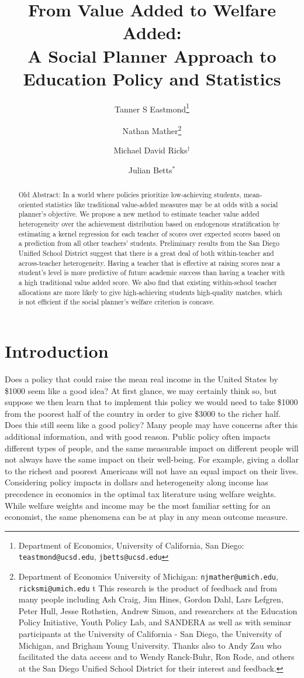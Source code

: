 \documentclass{article}
\title{From Value Added to Welfare Added: \\ A Social Planner Approach to Education Policy and Statistics}
\author{Tanner S Eastmond\thanks{Department of Economics, University of California, San Diego: \texttt{teastmond@ucsd.edu}, \texttt{jbetts@ucsd.edu}} \and Nathan Mather\thanks{Department of Economics University of Michigan: \texttt{njmather@umich.edu}, \texttt{ricksmi@umich.edu} \hspace{11em} {\color{white}t} This research is the product of feedback and from many people including Ash Craig, Jim Hines, Gordon Dahl, Lars Lefgren, Peter Hull, Jesse Rothstien,  Andrew Simon, and  researchers at the Education Policy Initiative, Youth Policy Lab, and SANDERA as well as with seminar participants at the University of California - San Diego, the University of Michigan, and Brigham Young University. Thanks also to Andy Zau who facilitated the data access and to  Wendy Ranck-Buhr, Ron Rode, and others at the San Diego Unified School District for their interest and feedback.} \and Michael David Ricks$^\dagger$ \and Julian Betts$^*$}
\date{\parbox{\linewidth}{\centering%
  This Draft Updated: \today\endgraf
  }}
\theoremstyle{definition}
\theoremstyle{definition}
\theoremstyle{definition}
\begin{document}
\maketitle



\onehalfspacing

\begin{abstract}
{\color{red}Old Abstract:} In a world where policies prioritize low-achieving students, mean-oriented statistics like traditional value-added measures may be at odds with a social planner’s objective. We propose a new method to estimate teacher value added heterogeneity over the achievement distribution based on endogenous stratification by estimating a kernel regression for each teacher of scores over expected scores based on a prediction from all other teachers’ students.  Preliminary results from the San Diego Unified School District suggest that there is a great deal of both within-teacher and across-teacher heterogeneity. Having a teacher that is effective at raising scores near a student’s level is more predictive of future academic success than having a teacher with a high traditional value added score. We also find that existing within-school teacher allocations are more likely to give high-achieving students high-quality matches, which is not efficient if the social planner’s welfare criterion is concave.


\end{abstract}


\doublespacing
\vfill
\pagebreak



\section{Introduction}

Does a policy that could raise the mean real income in the United States by \$1000 seem like a good idea? At first glance, we may certainly think so, but suppose we then learn that to implement this policy we would need to take \$1000 from the poorest half of the country in order to give \$3000 to the richer half. Does this still seem like a good policy? Many people may have concerns after this additional information, and with good reason. Public policy often impacts different types of people, and the same measurable impact on different people will not always have the same impact on their well-being. For example, giving a dollar to the richest and poorest Americans will not have an equal impact on their lives. Considering policy impacts in dollars and heterogeneity along income has precedence in economics in the optimal tax literature using welfare weights. While welfare weights and income may be the most familiar setting for an economist, the same phenomena can be at play in any mean outcome measure.
\end{document}
